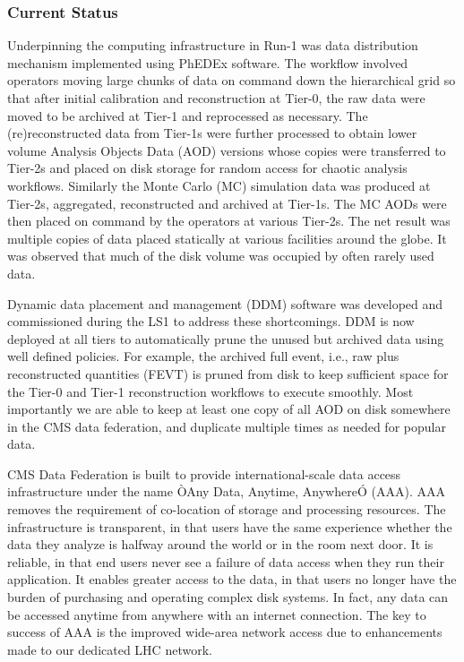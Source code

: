 \documentclass[11pt,a4paper]{article}
\begin{document}
\subsubsection{Current Status}


Underpinning the computing infrastructure in Run-1 was data
distribution mechanism implemented using PhEDEx software. The workflow
involved operators moving large chunks of data on command down the
hierarchical grid so that after initial calibration and reconstruction
at Tier-0, the raw data were moved to be archived at Tier-1 and
reprocessed as necessary. The (re)reconstructed data from Tier-1s were
further processed to obtain lower volume Analysis Objects Data (AOD)
versions whose copies were transferred to Tier-2s and placed on disk
storage for random access for chaotic analysis workflows.  Similarly
the Monte Carlo (MC) simulation data was produced at Tier-2s,
aggregated, reconstructed and archived at Tier-1s. The MC AODs were
then placed on command by the operators at various Tier-2s. The net
result was multiple copies of data placed statically at various
facilities around the globe. It was observed that much of the disk
volume was occupied by often rarely used data.

Dynamic data placement and management (DDM) software was developed and
commissioned during the LS1 to address these shortcomings. DDM is now
deployed at all tiers to automatically prune the unused but archived
data using well defined policies.  For example, the archived full
event, i.e., raw plus reconstructed quantities (FEVT) is pruned from
disk to keep sufficient space for the Tier-0 and Tier-1 reconstruction
workflows to execute smoothly. Most importantly we are able to keep at
least one copy of all AOD on disk somewhere in the CMS data
federation, and duplicate multiple times as needed for popular data.


CMS Data Federation is built to provide international-scale data
access infrastructure under the name ÒAny Data, Anytime, AnywhereÓ
(AAA). AAA removes the requirement of co-location of storage and
processing resources.  The infrastructure is transparent, in that
users have the same experience whether the data they analyze is
halfway around the world or in the room next door.  It is reliable, in
that end users never see a failure of data access when they run their
application.  It enables greater access to the data, in that users no
longer have the burden of purchasing and operating complex disk
systems. In fact, any data can be accessed anytime from anywhere with
an internet connection. The key to success of AAA is the improved
wide-area network access due to enhancements made to our dedicated LHC
network.
\end{document}
